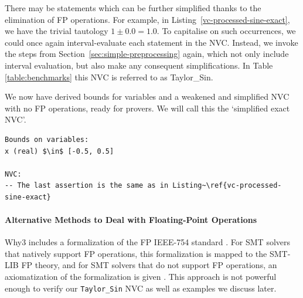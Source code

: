 \documentclass[runningheads]{llncs}
\begin{document}
There may be statements which can be further simplified thanks to the elimination of FP operations.
For example, in Listing~\ref{vc-processed-sine-exact}, we have the trivial tautology $1 \pm 0.0 = 1.0$.
To capitalise on such occurrences, we 
could once again interval-evaluate each statement in the NVC.
Instead, we invoke the steps from Section~\ref{sec:simple-preprocessing} again, which not only include interval evaluation, but also make any consequent simplifications.
In Table \ref{table:benchmarks} this NVC is referred to as Taylor\_Sin.

We now have derived bounds for variables and a weakened and simplified NVC with no FP operations, ready for provers.  We will call this the `simplified exact NVC'.


\begin{lstlisting}[float=t,caption={\lstinline{Taylor_Sin} simplified exact NVC, ready for provers}, label=vc-processed-sine-exact-s,basicstyle=\fontsize{7.5}{9pt}\tt]
Bounds on variables:
x (real) $\in$ [-0.5, 0.5] 

NVC: 
-- The last assertion is the same as in Listing~\ref{vc-processed-sine-exact}
\end{lstlisting}

\paragraph{Alternative Methods to Deal with Floating-Point Operations}
Why3 includes a formalization of the FP IEEE-754 standard \cite{noauthor_ieee_2008}.
For SMT solvers that natively support FP operations, this formalization is mapped to the SMT-LIB FP theory, and
for SMT solvers that do not support FP operations, an axiomatization of the formalization is given \cite{fumex_automated_2017}.
This approach is not powerful enough to verify our \lstinline{Taylor_Sin} NVC as well as examples we discuss later.
\end{document}
